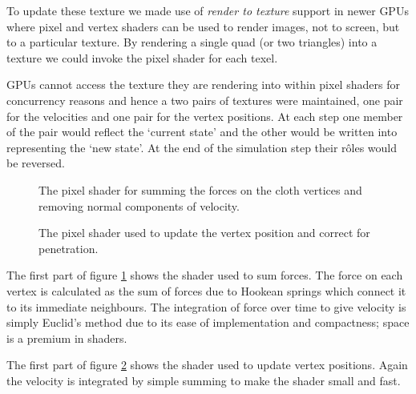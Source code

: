 To update these texture we made use of \emph{render to texture} support in newer GPUs
where pixel and vertex shaders can be used to render images, not to screen, but to
a particular texture. By rendering a single quad (or two triangles) into a texture
we could invoke the pixel shader for each texel.

GPUs cannot access the texture they are rendering into within pixel shaders for
concurrency reasons and hence a two pairs of textures were maintained, one pair
for the velocities and one pair for the vertex positions. At each step one
member of the pair would reflect the `current state' and the other would be
written into representing the `new state'. At the end of the simulation step
their r\^oles would be reversed.


\begin{figure}[p]
\centering
\scalebox{0.7}{
\begin{minipage}{\textwidth}
\singlespacing

\end{minipage}}
\caption{\label{fig:calcForces}The pixel shader for summing the forces on the cloth vertices
and removing normal components of velocity.}
\end{figure}

\begin{figure}[p]
\centering
\scalebox{0.7}{
\begin{minipage}{\textwidth}
\singlespacing

\end{minipage}}
\caption{\label{fig:calcVertices}The pixel shader used to update the vertex position and
correct for penetration.}
\end{figure}

The first part of figure \ref{fig:calcForces} shows the shader used to sum forces. The force
on each vertex is calculated as the sum of forces due to Hookean springs which connect it
to its immediate neighbours. The integration of force over time to give velocity
is simply Euclid's method due to its ease of implementation and compactness; space is a premium
in shaders.

The first part of figure \ref{fig:calcVertices} shows the shader used to update vertex positions.
Again the velocity is integrated by simple summing to make the shader small and fast.

